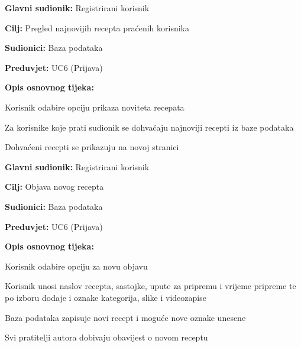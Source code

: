 					\noindent {}
					\begin{packed_item}
						
						\item \textbf{Glavni sudionik: }Registrirani korisnik
						\item \textbf{Cilj: }Pregled najnovijih recepta praćenih korisnika
						\item \textbf{Sudionici: }Baza podataka
						\item \textbf{Preduvjet: }UC6 (Prijava)
						\item \textbf{Opis osnovnog tijeka:}
						
						\item[] \begin{packed_enum}
							\item Korisnik odabire opciju prikaza noviteta recepata
							\item Za korisnike koje prati sudionik se dohvaćaju najnoviji recepti iz baze podataka
							\item Dohvaćeni recepti se prikazuju na novoj stranici
						\end{packed_enum}
					\end{packed_item}


					\noindent \underbar{\textbf{UC8 - Objava recepta}}
					\begin{packed_item}
						
						\item \textbf{Glavni sudionik: }Registrirani korisnik
						\item \textbf{Cilj: }Objava novog recepta
						\item \textbf{Sudionici: }Baza podataka
						\item \textbf{Preduvjet: }UC6 (Prijava)
						\item \textbf{Opis osnovnog tijeka:}
						
						\item[] \begin{packed_enum}
							\item Korisnik odabire opciju za novu objavu
							\item Korisnik unosi naslov recepta, sastojke, upute za pripremu i vrijeme pripreme te po izboru dodaje i oznake kategorija, slike i videozapise
							\item Baza podataka zapisuje novi recept i moguće nove oznake unesene
							\item Svi pratitelji autora dobivaju obavijest o novom receptu
						\end{packed_enum}
					\end{packed_item}
					
